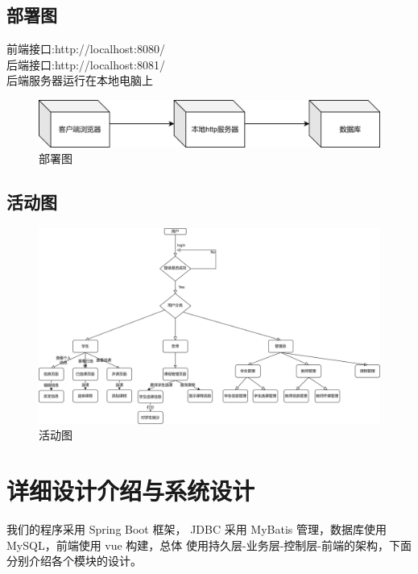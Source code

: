 \documentclass[12pt, a4paper]{article}
\begin{document}
\subsection{部署图}
\noindent 前端接口:http://localhost:8080/\\
后端接口:http://localhost:8081/\\
后端服务器运行在本地电脑上\\
\begin{figure}[H]
	\centering
	\includegraphics[width = 0.8 \textwidth]{deployment.png}
	\caption{部署图}
\end{figure}

\subsection{活动图}
\begin{figure}[H]
	\centering
	\includegraphics[width = 0.8 \textwidth]{activity.png}
	\caption{活动图}
\end{figure}

\section{详细设计介绍与系统设计}
我们的程序采用 Spring Boot 框架， JDBC 采用 MyBatis 管理，数据库使用 MySQL，前端使用 vue 构建，总体
使用持久层-业务层-控制层-前端的架构，下面分别介绍各个模块的设计。
\end{document}
